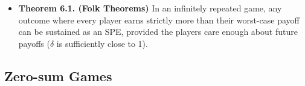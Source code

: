 \documentclass[notitlepage]{article}
\begin{document}
\begin{itemize}
\begin{enumerate}
    \begin{itemize}
        \item Note that all possible deviation strategies consist of sequences of these three. Since the baseline strategy of tit-for-tat is always a weakly dominant strategy, both players playing tit-for-tat is a Nash equilibrium.
    \end{itemize}
\end{enumerate}
\item \textbf{Theorem 6.1. (Folk Theorems)} In an infinitely repeated game, any outcome where every player earns strictly more than their worst-case payoff can be sustained as an SPE, provided the players care enough about future payoffs (\(\delta\) is sufficiently close to 1).
\end{itemize}

\subsection{Zero-sum Games}
\end{document}
